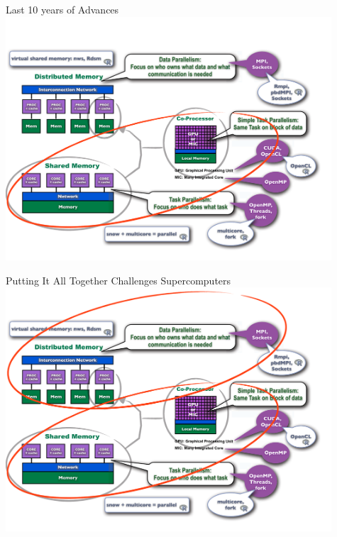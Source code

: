 \begin{frame}
\begin{block}{Last 10 years of Advances}
    \includegraphics[width=0.91\textwidth]{pics/ParallelHardware9.pdf}
\end{block}
\end{frame}

\begin{frame}
\begin{block}{Putting It All Together Challenges Supercomputers}
    \includegraphics[width=0.91\textwidth]{pics/ParallelHardware10.pdf}
\end{block}
\end{frame}

